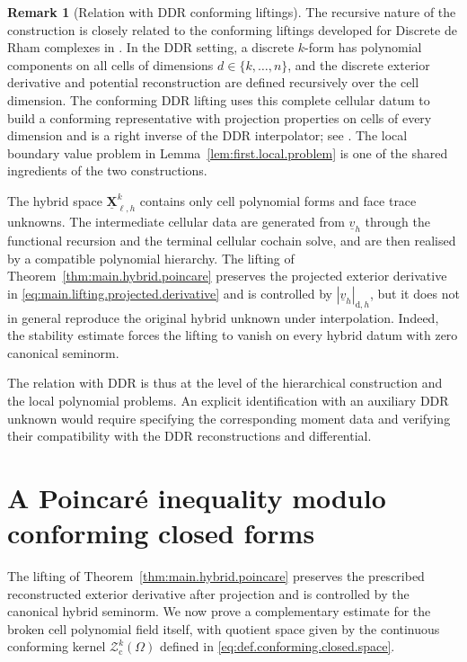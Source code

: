 \documentclass[a4paper,11pt]{article}
\theoremstyle{definition}
\newtheorem{remark}[theorem]{Remark}
\newcommand{\DIFF}{\mathrm{d}}
\newcommand{\uXh}[1]{\underline{\boldsymbol{X}}_{\ell,h}^{#1}}
\begin{document}
\begin{remark}[Relation with DDR conforming liftings]
\label{rem:relation.with.ddr.lifting}
The recursive nature of the construction is closely related to the conforming liftings developed for Discrete de Rham complexes in \cite{Di-Pietro.Droniou.Pitassi:25}.
In the DDR setting, a discrete $k$-form has polynomial components on all cells of dimensions $d\in\{k,\ldots,n\}$, and the discrete exterior derivative and potential reconstruction are defined recursively over the cell dimension.
The conforming DDR lifting uses this complete cellular datum to build a conforming representative with projection properties on cells of every dimension and is a right inverse of the DDR interpolator; see \cite[Theorem~3 and Remark~5]{Di-Pietro.Droniou.Pitassi:25}.
The local boundary value problem in Lemma~\ref{lem:first.local.problem} is one of the shared ingredients of the two constructions.

The hybrid space $\uXh{k}$ contains only cell polynomial forms and face trace unknowns.
The intermediate cellular data are generated from $\underline v_h$ through the functional recursion and the terminal cellular cochain solve, and are then realised by a compatible polynomial hierarchy.
The lifting of Theorem~\ref{thm:main.hybrid.poincare} preserves the projected exterior derivative in \eqref{eq:main.lifting.projected.derivative} and is controlled by $|\underline v_h|_{\DIFF,h}$, but it does not in general reproduce the original hybrid unknown under interpolation.
Indeed, the stability estimate forces the lifting to vanish on every hybrid datum with zero canonical seminorm.

The relation with DDR is thus at the level of the hierarchical construction and the local polynomial problems.
An explicit identification with an auxiliary DDR unknown would require specifying the corresponding moment data and verifying their compatibility with the DDR reconstructions and differential.
\end{remark}

\section{A Poincar\'e inequality modulo conforming closed forms}
\label{sec:poincare.conforming.closed}

The lifting of Theorem~\ref{thm:main.hybrid.poincare} preserves the prescribed reconstructed exterior derivative after projection and is controlled by the canonical hybrid seminorm.
We now prove a complementary estimate for the broken cell polynomial field itself, with quotient space given by the continuous conforming kernel $\mathcal Z_{\mathrm c}^k(\Omega)$ defined in \eqref{eq:def.conforming.closed.space}.
\end{document}
